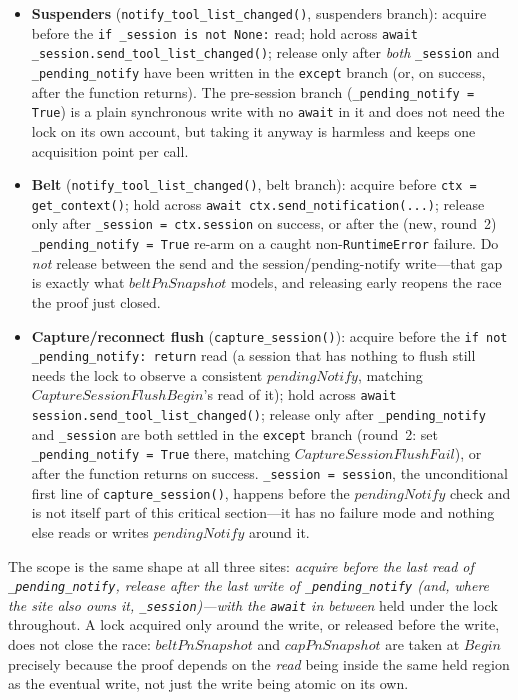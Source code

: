 \documentclass[a4paper,10pt,fleqn]{article}
\begin{document}
\begin{itemize}
  \item \textbf{Suspenders} (\texttt{notify\_tool\_list\_changed()},
    suspenders branch): acquire before the
    \texttt{if \_session is not None:} read; hold across
    \texttt{await \_session.send\_tool\_list\_changed()}; release only
    after \emph{both} \texttt{\_session} and \texttt{\_pending\_notify}
    have been written in the \texttt{except} branch (or, on success,
    after the function returns).  The pre-session branch
    (\texttt{\_pending\_notify = True}) is a plain synchronous write
    with no \texttt{await} in it and does not need the lock on its own
    account, but taking it anyway is harmless and keeps one acquisition
    point per call.
  \item \textbf{Belt} (\texttt{notify\_tool\_list\_changed()}, belt
    branch): acquire before \texttt{ctx = get\_context()}; hold across
    \texttt{await ctx.send\_notification(...)}; release only after
    \texttt{\_session = ctx.session} on success, or after the (new,
    round~2) \texttt{\_pending\_notify = True} re-arm on a caught
    non-\texttt{RuntimeError} failure.  Do \emph{not} release between
    the send and the session/pending-notify write---that gap is exactly
    what $beltPnSnapshot$ models, and releasing early reopens the race
    the proof just closed.
  \item \textbf{Capture/reconnect flush} (\texttt{capture\_session()}):
    acquire before the \texttt{if not \_pending\_notify: return} read
    (a session that has nothing to flush still needs the lock to
    observe a consistent $pendingNotify$, matching $CaptureSessionFlushBegin$'s
    read of it); hold across \texttt{await
    session.send\_tool\_list\_changed()}; release only after
    \texttt{\_pending\_notify} and \texttt{\_session} are both settled
    in the \texttt{except} branch (round~2: set
    \texttt{\_pending\_notify = True} there, matching
    $CaptureSessionFlushFail$), or after the function returns on
    success.  \texttt{\_session = session}, the unconditional first line
    of \texttt{capture\_session()}, happens before the
    $pendingNotify$ check and is not itself part of this critical
    section---it has no failure mode and nothing else reads or writes
    $pendingNotify$ around it.
\end{itemize}

The scope is the same shape at all three sites: \emph{acquire before
the last read of \texttt{\_pending\_notify}, release after the last
write of \texttt{\_pending\_notify} (and, where the site also owns it,
\texttt{\_session})---with the \texttt{await} in between} held under
the lock throughout.  A lock acquired only around the write, or
released before the write, does not close the race: $beltPnSnapshot$
and $capPnSnapshot$ are taken at $Begin$ precisely because the proof
depends on the \emph{read} being inside the same held region as the
eventual write, not just the write being atomic on its own.
\end{document}
